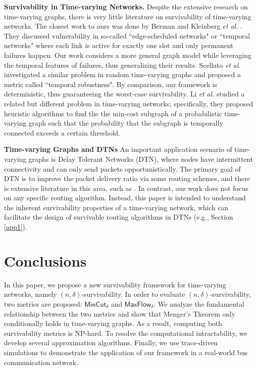 \documentclass[10pt, conference, letterpaper]{IEEEtran}
\begin{document}
\vspace{1mm}

\noindent \textbf{Survivability in Time-varying Networks.} Despite the extensive research on time-varying graphs, there is very little literature on survivability of time-varying networks. The closest work to ours was done by Berman \cite{vul} and Kleinberg \emph{et al.} \cite{con}. They discussed vulnerability in so-called ``edge-scheduled networks" or ``temporal networks" where each link is active for exactly one slot and only permanent failures happen. Our work considers a more general graph model while leveraging the temporal features of failures, thus generalizing their results. Scellato \emph{et al.} \cite{TVG4} investigated a similar problem in random time-varying graphs and proposed a metric called ``temporal robustness". By comparison, our framework is deterministic, thus guaranteeing the worst-case survivability. Li \emph{et al.} \cite{TVG-unreliable} studied a related but different problem in time-varying networks; specifically, they proposed heuristic algorithms to find the the min-cost subgraph of a probabilistic time-varying graph such that the probability that the subgraph is temporally connected exceeds a certain threshold.

\vspace{1mm}

\noindent \textbf{Time-varying Graphs and DTNs} An important application scenario of time-varying graphs is Delay Tolerant Networks (DTN), where nodes have intermittent connectivity and can only send packets opportunistically. The primary goal of DTN is  to improve the packet delivery ratio via some routing schemes, and there is extensive literature in this area, such as \cite{redundancy, DTN_routing1, DTN_routing2, DTN_routing3, TVG-unreliable}. In contrast, our work does not focus on any specific routing algorithm. Instead, this paper is intended to understand the inherent survivability properties of a time-varying network, which can facilitate the design of survivable routing algorithms in DTNs (e.g., Section \ref{app1}).
\section{Conclusions}\label{conclusion}
In this paper, we propose a new survivability framework for time-varying networks, namely $(n,\delta)$-survivability. In order to evaluate $(n,\delta)$-survivability, two metrics are proposed: $\mathsf{MinCut_{\delta}}$ and $\mathsf{MaxFlow_{\delta}}$.
We analyze the fundamental relationship between the two metrics and show that Menger's Theorem only conditionally holds in time-varying graphs. As a result, computing both survivability metrics is NP-hard. To resolve the computational intractability, we develop several approximation algorithms. Finally, we use trace-driven simulations to demonstrate the application of our framework in a real-world bus communication network.
\end{document}
